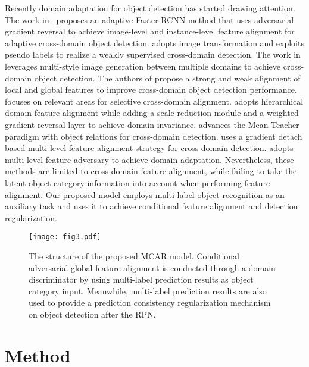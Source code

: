 \documentclass[runningheads]{llncs}
\begin{document}
Recently domain adaptation for object detection has started drawing attention. 
The work in~\cite{chen2018domain} proposes an adaptive Faster-RCNN method
that uses adversarial gradient reversal to 
achieve image-level and instance-level feature alignment for adaptive cross-domain object detection.
\cite{inoue2018cross} adopts image transformation and exploits pseudo labels to realize a weakly supervised cross-domain detection. 
The work in \cite{kim2019diversify} leverages multi-style image generation between multiple domains to achieve cross-domain object detection. 
The authors of \cite{saito2019strong} propose a strong and weak alignment of local and global features 
to improve cross-domain object detection performance. 
\cite{zhu2019adapting} focuses on relevant areas for selective cross-domain alignment. 
\cite{HeMulti} adopts hierarchical domain feature alignment while adding a scale reduction module 
and a weighted gradient reversal layer to achieve domain invariance. 
\cite{cai2019exploring} advances the Mean Teacher paradigm with object relations for cross-domain detection.
\cite{shen2019scl} uses a gradient detach based multi-level feature alignment strategy for cross-domain detection. 
\cite{xie2019multi} adopts multi-level feature adversary to achieve domain adaptation. 
Nevertheless, these methods are limited to cross-domain feature alignment,
while failing to take the latent object category information into account when performing feature alignment.
Our proposed model employs multi-label object recognition as an auxiliary task and 
uses it to achieve conditional feature alignment and detection regularization.





\begin{figure*}[th!]
\begin{center}
\texttt{[image: fig3.pdf]}
\end{center}
   \caption{The structure of the proposed MCAR model.
  Conditional adversarial global feature alignment is conducted through a domain discriminator by
	using multi-label prediction results as object category input. 
Meanwhile, multi-label prediction results are also used to provide a prediction consistency regularization
	mechanism on object detection after the RPN.} 
\label{fig:three}
\end{figure*}

\section{Method}
\end{document}
